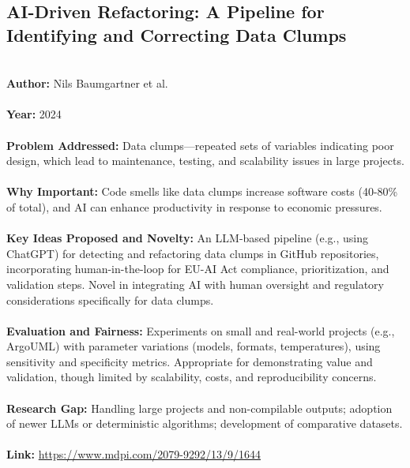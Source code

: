 \documentclass[12pt]{article}
\begin{document}
\subsection*{AI-Driven Refactoring: A Pipeline for Identifying and Correcting Data Clumps}
\\
\textbf{Author:} Nils Baumgartner et al. \\
\\
\textbf{Year:} 2024 \\
\\
\textbf{Problem Addressed:} Data clumps—repeated sets of variables indicating poor design, which lead to maintenance, testing, and scalability issues in large projects. \\
\\
\textbf{Why Important:} Code smells like data clumps increase software costs (40-80\% of total), and AI can enhance productivity in response to economic pressures. \\
\\
\textbf{Key Ideas Proposed and Novelty:} An LLM-based pipeline (e.g., using ChatGPT) for detecting and refactoring data clumps in GitHub repositories, incorporating human-in-the-loop for EU-AI Act compliance, prioritization, and validation steps. Novel in integrating AI with human oversight and regulatory considerations specifically for data clumps. \\
\\
\textbf{Evaluation and Fairness:} Experiments on small and real-world projects (e.g., ArgoUML) with parameter variations (models, formats, temperatures), using sensitivity and specificity metrics. Appropriate for demonstrating value and validation, though limited by scalability, costs, and reproducibility concerns. \\
\\
\textbf{Research Gap:} Handling large projects and non-compilable outputs; adoption of newer LLMs or deterministic algorithms; development of comparative datasets. \\
\\
\textbf{Link:} \url{https://www.mdpi.com/2079-9292/13/9/1644}
\pagebreak

\end{document}
